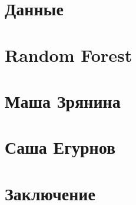 \documentclass[12pt,a4paper]{article}
\begin{document}
\section{Данные}

\section{Random Forest}

\section{Маша Зрянина}

\section{Саша Егурнов}

\section{Заключение}
\end{document}
